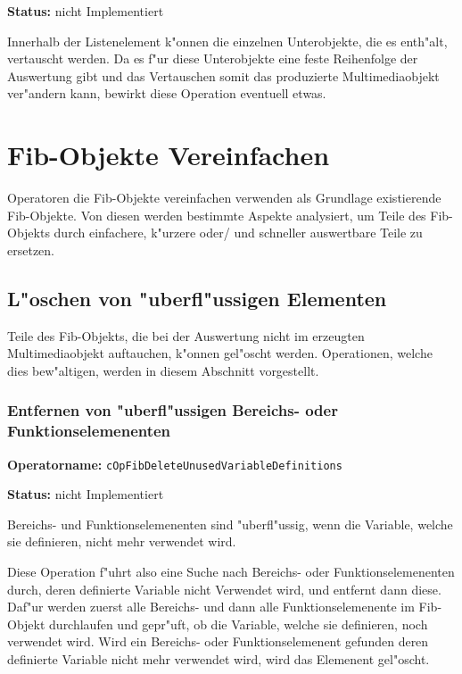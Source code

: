 \bigskip\noindent
\textbf{Status:} nicht Implementiert

\bigskip\noindent
Innerhalb der Listenelement k"onnen die einzelnen Unterobjekte, die es enth"alt, vertauscht werden. Da es f"ur diese Unterobjekte eine feste Reihenfolge der Auswertung gibt und das Vertauschen somit das produzierte Multimediaobjekt ver"andern kann, bewirkt diese Operation eventuell etwas.



\section{Fib-Objekte Vereinfachen}

Operatoren die Fib-Objekte vereinfachen verwenden als Grundlage existierende Fib-Objekte. Von diesen werden bestimmte Aspekte analysiert, um Teile des Fib-Objekts durch einfachere, k"urzere oder/ und schneller auswertbare Teile zu ersetzen.


\subsection{L"oschen von "uberfl"ussigen Elementen}

Teile des Fib-Objekts, die bei der Auswertung nicht im erzeugten Multimediaobjekt auftauchen, k"onnen gel"oscht werden. Operationen, welche dies bew"altigen, werden in diesem Abschnitt vorgestellt.


\subsubsection{Entfernen von "uberfl"ussigen Bereichs- oder Funktionselemenenten}

\textbf{Operatorname:} \verb|cOpFibDeleteUnusedVariableDefinitions|

\bigskip\noindent
\textbf{Status:} nicht Implementiert

\bigskip\noindent
Bereichs- und Funktionselemenenten sind "uberfl"ussig, wenn die Variable, welche sie definieren, nicht mehr verwendet wird.

Diese Operation f"uhrt also eine Suche nach Bereichs- oder Funktionselemenenten durch, deren definierte Variable nicht Verwendet wird, und entfernt dann diese.
Daf"ur werden zuerst alle Bereichs- und dann alle Funktionselemenente im Fib-Objekt durchlaufen und gepr"uft, ob die Variable, welche sie definieren, noch verwendet wird. Wird ein Bereichs- oder Funktionselemenent gefunden deren definierte Variable nicht mehr verwendet wird, wird das Elemenent gel"oscht.


